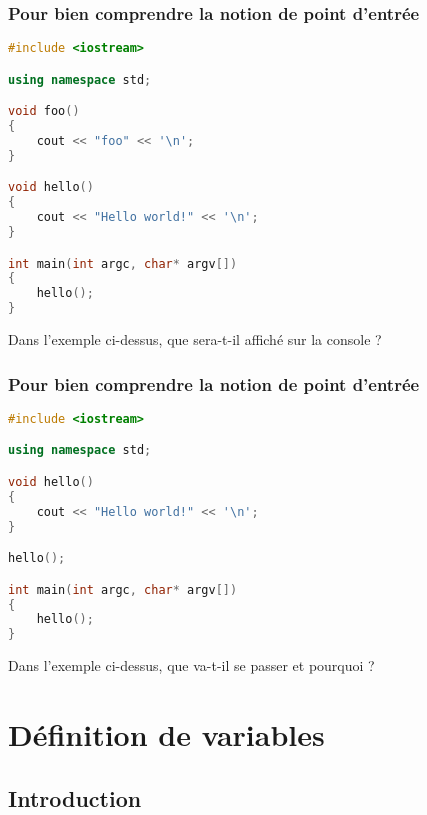 \documentclass{cppcourses}
\begin{document}
\begin{frame}[fragile]

\frametitle{Pour bien comprendre la notion de point d'entrée}

\begin{example}
    \begin{lstlisting}[language = c++]
#include <iostream>

using namespace std;

void foo()
{
    cout << "foo" << '\n';
}

void hello()
{
    cout << "Hello world!" << '\n';
}

int main(int argc, char* argv[])
{
    hello();
}
     \end{lstlisting}

Dans l'exemple ci-dessus, que sera-t-il affiché sur la console ?

\end{example}

\end{frame}

\begin{frame}[fragile]

\frametitle{Pour bien comprendre la notion de point d'entrée}

\begin{example}
    \begin{lstlisting}[language = c++]
#include <iostream>

using namespace std;

void hello()
{
    cout << "Hello world!" << '\n';
}

hello();

int main(int argc, char* argv[])
{
    hello();
}
     \end{lstlisting}

Dans l'exemple ci-dessus, que va-t-il se passer et pourquoi ?

\end{example}

\end{frame}

\section{Définition de variables}

\subsection{Introduction}
\end{document}
